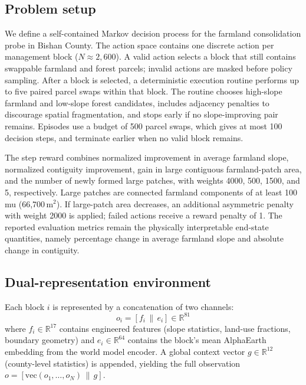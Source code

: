 \documentclass{article}
\begin{document}
\subsection{Problem setup}

We define a self-contained Markov decision process for the farmland consolidation probe in Bishan County. The action space contains one discrete action per management block ($N \approx 2{,}600$). A valid action selects a block that still contains swappable farmland and forest parcels; invalid actions are masked before policy sampling. After a block is selected, a deterministic execution routine performs up to five paired parcel swaps within that block. The routine chooses high-slope farmland and low-slope forest candidates, includes adjacency penalties to discourage spatial fragmentation, and stops early if no slope-improving pair remains. Episodes use a budget of 500 parcel swaps, which gives at most 100 decision steps, and terminate earlier when no valid block remains.

The step reward combines normalized improvement in average farmland slope, normalized contiguity improvement, gain in large contiguous farmland-patch area, and the number of newly formed large patches, with weights 4000, 500, 1500, and 5, respectively. Large patches are connected farmland components of at least 100 mu (66{,}700\,m$^2$). If large-patch area decreases, an additional asymmetric penalty with weight 2000 is applied; failed actions receive a reward penalty of 1. The reported evaluation metrics remain the physically interpretable end-state quantities, namely percentage change in average farmland slope and absolute change in contiguity.

\subsection{Dual-representation environment}

Each block $i$ is represented by a concatenation of two channels:
\begin{equation}
o_i = [f_i \,\|\, e_i] \in \mathbb{R}^{81}
\end{equation}
where $f_i \in \mathbb{R}^{17}$ contains engineered features (slope statistics, land-use fractions, boundary geometry) and $e_i \in \mathbb{R}^{64}$ contains the block's mean AlphaEarth embedding from the world model encoder. A global context vector $g \in \mathbb{R}^{12}$ (county-level statistics) is appended, yielding the full observation $o = [\text{vec}(o_1, \ldots, o_N) \,\|\, g]$.
\end{document}
